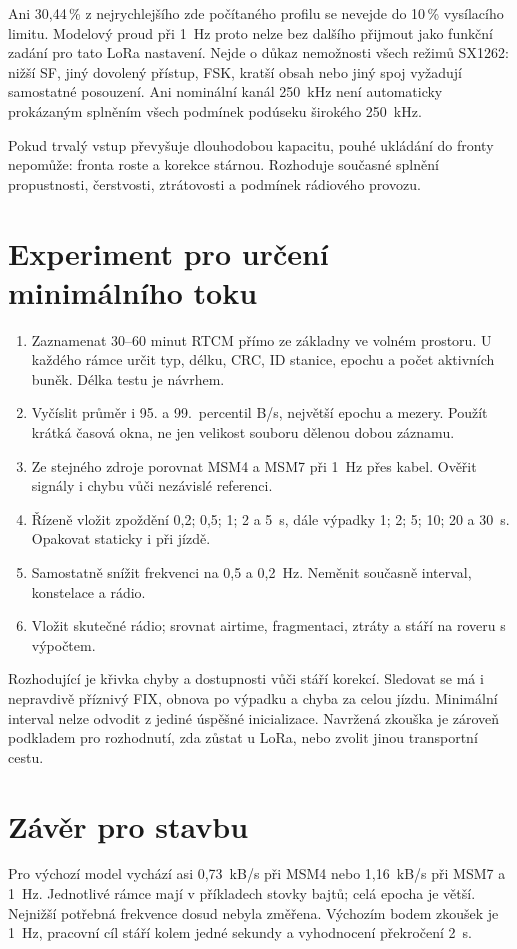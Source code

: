 \documentclass[11pt,a4paper]{article}
\begin{document}
Ani 30,44\,\% z nejrychlejšího zde počítaného profilu se nevejde do 10\,\% vysílacího limitu. Modelový proud při 1~Hz proto nelze bez dalšího přijmout jako funkční zadání pro tato LoRa nastavení. Nejde o důkaz nemožnosti všech režimů SX1262: nižší SF, jiný dovolený přístup, FSK, kratší obsah nebo jiný spoj vyžadují samostatné posouzení. Ani nominální kanál 250~kHz není automaticky prokázaným splněním všech podmínek podúseku širokého 250~kHz.

Pokud trvalý vstup převyšuje dlouhodobou kapacitu, pouhé ukládání do fronty nepomůže: fronta roste a korekce stárnou. Rozhoduje současné splnění propustnosti, čerstvosti, ztrátovosti a podmínek rádiového provozu.

\section{Experiment pro určení minimálního toku}
\begin{enumerate}
\item Zaznamenat 30--60 minut RTCM přímo ze základny ve volném prostoru. U každého rámce určit typ, délku, CRC, ID stanice, epochu a počet aktivních buněk. Délka testu je návrhem.
\item Vyčíslit průměr i 95. a 99.~percentil B/s, největší epochu a mezery. Použít krátká časová okna, ne jen velikost souboru dělenou dobou záznamu.
\item Ze stejného zdroje porovnat MSM4 a MSM7 při 1~Hz přes kabel. Ověřit signály i chybu vůči nezávislé referenci.
\item Řízeně vložit zpoždění 0,2; 0,5; 1; 2 a 5~s, dále výpadky 1; 2; 5; 10; 20 a 30~s. Opakovat staticky i při jízdě.
\item Samostatně snížit frekvenci na 0,5 a 0,2~Hz. Neměnit současně interval, konstelace a rádio.
\item Vložit skutečné rádio; srovnat airtime, fragmentaci, ztráty a stáří na roveru s výpočtem.
\end{enumerate}
Rozhodující je křivka chyby a dostupnosti vůči stáří korekcí. Sledovat se má i nepravdivě příznivý FIX, obnova po výpadku a chyba za celou jízdu. Minimální interval nelze odvodit z jediné úspěšné inicializace. Navržená zkouška je zároveň podkladem pro rozhodnutí, zda zůstat u LoRa, nebo zvolit jinou transportní cestu.

\section{Závěr pro stavbu}
Pro výchozí model vychází asi 0,73~kB/s při MSM4 nebo 1,16~kB/s při MSM7 a 1~Hz. Jednotlivé rámce mají v příkladech stovky bajtů; celá epocha je větší. Nejnižší potřebná frekvence dosud nebyla změřena. Výchozím bodem zkoušek je 1~Hz, pracovní cíl stáří kolem jedné sekundy a vyhodnocení překročení 2~s.
\end{document}
